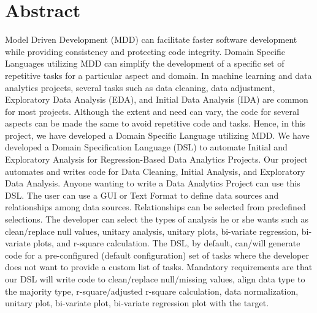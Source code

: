 \section{Abstract}
Model Driven Development (MDD) can facilitate faster software development while providing consistency and protecting code integrity. Domain Specific Languages utilizing MDD can simplify the development of a specific set of repetitive tasks for a particular aspect and domain. In machine learning and data analytics projects, several tasks such as data cleaning, data adjustment, Exploratory Data Analysis (EDA), and Initial Data Analysis (IDA) are common for most projects. Although the extent and need can vary,  the code for several  aspects can be made the same to avoid repetitive code and tasks. Hence, in this project, we have developed a Domain Specific Language utilizing MDD. We have developed a Domain Specification Language (DSL) to automate Initial and Exploratory Analysis for Regression-Based Data Analytics Projects. Our project automates and writes code for Data Cleaning, Initial Analysis, and Exploratory Data Analysis. Anyone wanting to write a Data Analytics Project can use this DSL. The user can use a GUI or Text Format to define data sources and relationships among data sources. Relationships can be selected from predefined selections. The developer can select the types of analysis he or she wants such as clean/replace null values, unitary analysis, unitary plots, bi-variate regression, bi-variate plots, and r-square calculation. The DSL, by default, can/will generate code for a pre-configured (default configuration) set of tasks where the developer does not want to provide a custom list of tasks. Mandatory requirements are that our DSL will write code to clean/replace null/missing values, align data type to the majority type, r-square/adjusted r-square calculation, data normalization, unitary plot, bi-variate plot, bi-variate regression plot with the target.


